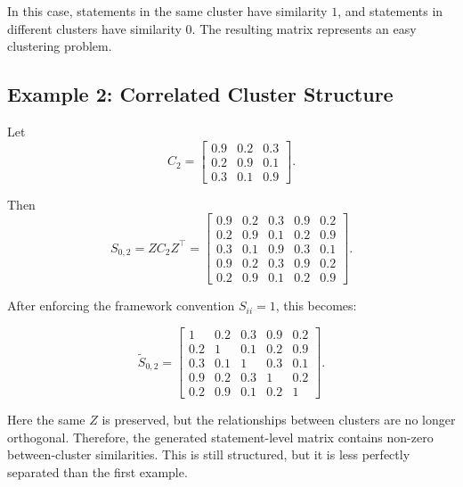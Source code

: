 \documentclass[11pt,a4paper]{article}
\begin{document}
In this case, statements in the same cluster have similarity \(1\), and statements in different clusters have similarity \(0\). The resulting matrix represents an easy clustering problem.

\subsection*{Example 2: Correlated Cluster Structure}

Let
\[
C_2 =
\begin{bmatrix}
0.9 & 0.2 & 0.3\\
0.2 & 0.9 & 0.1\\
0.3 & 0.1 & 0.9
\end{bmatrix}.
\]

Then
\[
S_{0,2}=ZC_2Z^\top
=
\begin{bmatrix}
0.9 & 0.2 & 0.3 & 0.9 & 0.2\\
0.2 & 0.9 & 0.1 & 0.2 & 0.9\\
0.3 & 0.1 & 0.9 & 0.3 & 0.1\\
0.9 & 0.2 & 0.3 & 0.9 & 0.2\\
0.2 & 0.9 & 0.1 & 0.2 & 0.9
\end{bmatrix}.
\]

After enforcing the framework convention \(S_{ii}=1\), this becomes:

\[
\widetilde{S}_{0,2}
=
\begin{bmatrix}
1 & 0.2 & 0.3 & 0.9 & 0.2\\
0.2 & 1 & 0.1 & 0.2 & 0.9\\
0.3 & 0.1 & 1 & 0.3 & 0.1\\
0.9 & 0.2 & 0.3 & 1 & 0.2\\
0.2 & 0.9 & 0.1 & 0.2 & 1
\end{bmatrix}.
\]

Here the same \(Z\) is preserved, but the relationships between clusters are no longer orthogonal. Therefore, the generated statement-level matrix contains non-zero between-cluster similarities. This is still structured, but it is less perfectly separated than the first example.
\end{document}
